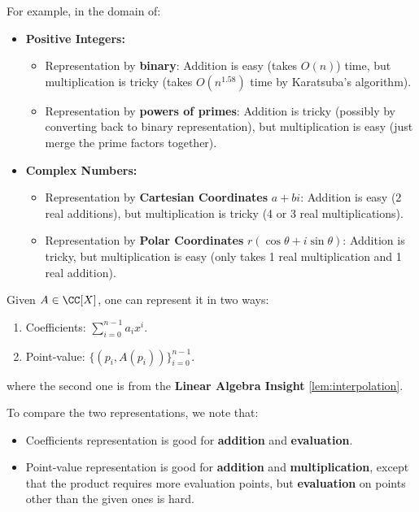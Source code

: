 For example, in the domain of:
\begin{itemize}
	\item \textbf{Positive Integers:}
	      \begin{itemize}
		      \item Representation by \textbf{binary}: Addition is easy (takes $O(n)$) time, but multiplication is tricky (takes $O(n^{1.58})$ time by Karatsuba's algorithm).
		      \item Representation by \textbf{powers of primes}: Addition is tricky (possibly by converting back to binary representation), but multiplication is easy (just merge the prime factors together).
	      \end{itemize}
	\item \textbf{Complex Numbers:}
	      \begin{itemize}
		      \item Representation by \textbf{Cartesian Coordinates} \( a + bi \): Addition is easy (2 real additions), but multiplication is tricky (4 or 3 real multiplications).
		      \item Representation by \textbf{Polar Coordinates} \( r(\cos \theta + i\sin \theta) \): Addition is tricky, but multiplication is easy (only takes 1 real multiplication and 1 real addition).
	      \end{itemize}
\end{itemize}

\begin{definition}
	Given \( A \in \CC[X] \), one can represent it in two ways:
	\begin{enumerate}
		\item Coefficients: \( \sum_{i=0}^{n-1}a_ix^i \).
		\item Point-value: \( \{(p_i, A(p_i))\}_{i=0}^{n-1} \).
	\end{enumerate}

	where the second one is from the \textbf{Linear Algebra Insight} \ref{lem:interpolation}.
\end{definition}

To compare the two representations, we note that:
\begin{itemize}
	\item Coefficients representation is good for \textbf{addition} and \textbf{evaluation}.
	\item Point-value representation is good for \textbf{addition} and \textbf{multiplication}, except that the product requires more evaluation points, but \textbf{evaluation} on points other than the given ones is hard.
\end{itemize}

